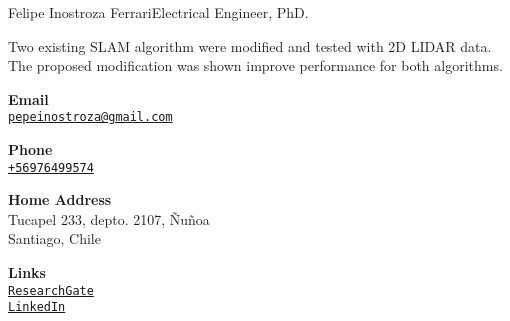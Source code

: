 \documentclass{article}
\begin{document}
\begin{cv}[avatar]{Felipe Inostroza Ferrari}{Electrical Engineer, PhD.}
\begin{cvevent}[2012][2014]
Two existing SLAM algorithm were modified and tested with 2D LIDAR data. The proposed modification was shown improve performance for both algorithms.
\end{cvevent}
\begin{cvevent}[2007][2014]
\end{cvevent}
\begin{cvevent}[2007][2014]
\end{cvevent}


% 
%




\cvsidebar %



\begin{cvitem}[Envelope][4]
    \textbf{Email}\\
    \href{mailto:pepeinostroza@gmail.com}{\texttt{pepeinostroza@gmail.com}}
\end{cvitem}

\cvseparator[3]
\begin{cvitem}[Phone][4]
    \textbf{Phone}\\
    \href{tel:+56976499574}{\texttt{+56976499574}}
\end{cvitem}

\cvseparator[3]
\begin{cvitem}[Home][4]
    \textbf{Home Address}\\
    Tucapel 233, depto. 2107, Ñuñoa\\ Santiago, Chile
\end{cvitem}

\cvseparator[3]
\begin{cvitem}[Globe][4]
    \textbf{Links}\\
    \href{https://www.researchgate.net/profile/Felipe-Inostroza-4}{\texttt{ResearchGate}} \\
    \href{https://www.linkedin.com/in/felipe-inostroza-ferrari-a0852035/}{\texttt{LinkedIn}}
\end{cvitem}



\end{cv}
\end{document}
